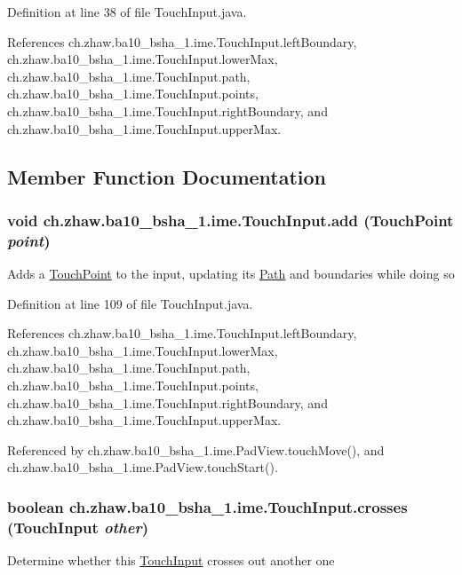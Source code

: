 Definition at line 38 of file TouchInput.java.

References ch.zhaw.ba10\_\-bsha\_\-1.ime.TouchInput.leftBoundary, ch.zhaw.ba10\_\-bsha\_\-1.ime.TouchInput.lowerMax, ch.zhaw.ba10\_\-bsha\_\-1.ime.TouchInput.path, ch.zhaw.ba10\_\-bsha\_\-1.ime.TouchInput.points, ch.zhaw.ba10\_\-bsha\_\-1.ime.TouchInput.rightBoundary, and ch.zhaw.ba10\_\-bsha\_\-1.ime.TouchInput.upperMax.

\subsection{Member Function Documentation}
\hypertarget{classch_1_1zhaw_1_1ba10__bsha__1_1_1ime_1_1TouchInput_a658d320b9d5c19adcbcd583476ef59e1}{
\subsubsection[{add}]{\setlength{\rightskip}{0pt plus 5cm}void ch.zhaw.ba10\_\-bsha\_\-1.ime.TouchInput.add ({\bf TouchPoint} {\em point})}}
\label{classch_1_1zhaw_1_1ba10__bsha__1_1_1ime_1_1TouchInput_a658d320b9d5c19adcbcd583476ef59e1}
Adds a \hyperlink{classch_1_1zhaw_1_1ba10__bsha__1_1_1TouchPoint}{TouchPoint} to the input, updating its \hyperlink{}{Path} and boundaries while doing so 

Definition at line 109 of file TouchInput.java.

References ch.zhaw.ba10\_\-bsha\_\-1.ime.TouchInput.leftBoundary, ch.zhaw.ba10\_\-bsha\_\-1.ime.TouchInput.lowerMax, ch.zhaw.ba10\_\-bsha\_\-1.ime.TouchInput.path, ch.zhaw.ba10\_\-bsha\_\-1.ime.TouchInput.points, ch.zhaw.ba10\_\-bsha\_\-1.ime.TouchInput.rightBoundary, and ch.zhaw.ba10\_\-bsha\_\-1.ime.TouchInput.upperMax.

Referenced by ch.zhaw.ba10\_\-bsha\_\-1.ime.PadView.touchMove(), and ch.zhaw.ba10\_\-bsha\_\-1.ime.PadView.touchStart().\hypertarget{classch_1_1zhaw_1_1ba10__bsha__1_1_1ime_1_1TouchInput_adb0a9fe73a2091ae7c3bdebe40be8a25}{
\subsubsection[{crosses}]{\setlength{\rightskip}{0pt plus 5cm}boolean ch.zhaw.ba10\_\-bsha\_\-1.ime.TouchInput.crosses ({\bf TouchInput} {\em other})}}
\label{classch_1_1zhaw_1_1ba10__bsha__1_1_1ime_1_1TouchInput_adb0a9fe73a2091ae7c3bdebe40be8a25}
Determine whether this \hyperlink{classch_1_1zhaw_1_1ba10__bsha__1_1_1ime_1_1TouchInput}{TouchInput} crosses out another one


